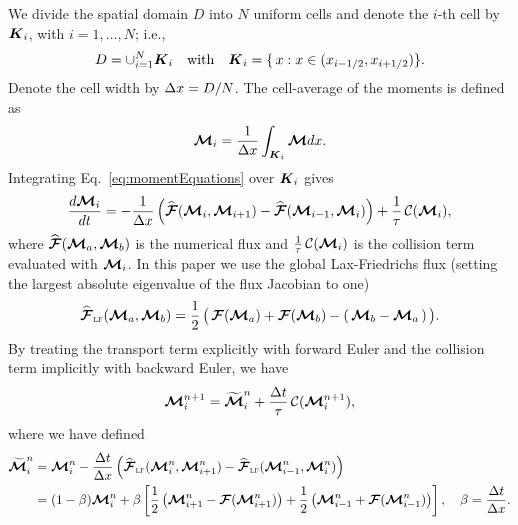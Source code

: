 We divide the spatial domain $D$ into $N$ uniform cells and denote the $i$-th cell by $\boldsymbol{K}_{i}$, with $i = 1,\ldots,N$; i.e.,
\begin{equation*}
  D = \cup_{i = 1}^{N} \boldsymbol{K}_{i} \quad \text{with} \quad
  \boldsymbol{K}_{i}=\{\,x : x\in(x_{i-1/2}, x_{i+1/2})\}.
\end{equation*}
Denote the cell width by $\Delta x = D/N$.  
The cell-average of the moments is defined as
\begin{equation}
  \boldsymbol{\mathcal{M}}_{i} = \dfrac{1}{\Delta x} \int_{\boldsymbol{K}_i}\boldsymbol{\mathcal{M}} dx.
\end{equation}
Integrating Eq.~\eqref{eq:momentEquations} over $\boldsymbol{K}_{i}$ gives
\begin{equation}
  \dfrac{d \bcM_{i}}{d t} = - \dfrac{1}{\dx} \left( \widehat{\bcF}(\bcM_{i},\bcM_{i+1}) -  \widehat{\bcF}(\bcM_{i-1},\bcM_{i})\right) + \f{1}{\tau}\,\cC(\bcM_{i}),
  \label{eq:SemiDiscretizatedMomentEquation}
\end{equation}
where $\widehat{\boldsymbol{\mathcal{F}}}(\boldsymbol{\mathcal{M}}_{a},\boldsymbol{\mathcal{M}}_{b})$ is the numerical flux and $\frac{1}{\tau}\,\mathcal{C}(\boldsymbol{\mathcal{M}}_{i})$ is the collision term evaluated with $\boldsymbol{\mathcal{M}}_{i}$.
In this paper we use the global Lax-Friedrichs flux (setting the largest absolute eigenvalue of the flux Jacobian to one)
\begin{equation}
  \widehat{\bcF}_{\LF}(\vect{\cM}_{a},\vect{\cM}_{b})
  =\f{1}{2}\,\big(\,\bcF(\vect{\cM}_{a})+\bcF(\vect{\cM}_{b})-(\,\vect{\cM}_{b}-\vect{\cM}_{a}\,)\,\big).
  \label{eq:Lax-Friedrichs flux}
\end{equation}
By treating the transport term explicitly with forward Euler and the collision term implicitly with backward Euler, we have
\begin{align}
  \bcM_{i}^{n+1} = \widetilde{\bcM}^{n}_{i} + \f{\dt}{\tau}\,\cC(\bcM^{n+1}_{i}),
  \label{eq:MomentIMEX}
\end{align}
where we have defined
\begin{align}
  \widetilde{\bcM}^{n}_{i} 
  & = \bcM_{i}^{n} - \frac{\dt}{\dx} \left( \widehat{\bcF}_{\LF}(\bcM^{n}_{i},\bcM^{n}_{i+1}) -  \widehat{\bcF}_{\LF}(\bcM^{n}_{i-1},\bcM^{n}_{i})\right)\nonumber \\
  & = (1-\beta)\bcM_{i}^{n} + \beta\left[ \f{1}{2}\left( \bcM^{n}_{i+1}-\bcF(\bcM^{n}_{i+1})\right)  + \f{1}{2}\left( \bcM^{n}_{i-1}+\bcF(\bcM^{n}_{i-1})\right)\right],
  \quad\beta = \frac{\dt}{\dx}.  
\label{eq:widetildeM}
\end{align}

